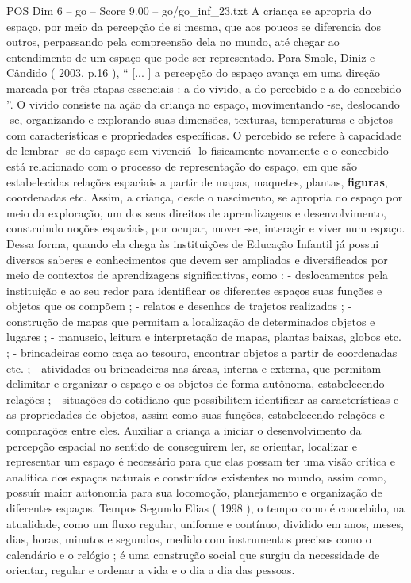 \begin{textsample}{POS Dim 6 – go – Score 9.00 – go/go\_inf\_23.txt}
A criança se apropria do espaço, por meio da percepção de si mesma, que aos poucos se diferencia dos outros, perpassando pela compreensão dela no mundo, até chegar ao entendimento de um espaço que pode ser representado.
Para Smole, Diniz e Cândido ( 2003, p.16 ), “ [... ] a percepção do espaço avança em uma direção marcada por três etapas essenciais : a do vivido, a do percebido e a do concebido ”.
O vivido consiste na ação da criança no espaço, movimentando -se, deslocando -se, organizando e explorando suas dimensões, texturas, temperaturas e objetos com características e propriedades específicas.
O percebido se refere à capacidade de lembrar -se do espaço sem vivenciá -lo fisicamente novamente e o concebido está relacionado com o processo de representação do espaço, em que são estabelecidas relações espaciais a partir de mapas, maquetes, plantas, \textbf{figuras}, coordenadas etc.
Assim, a criança, desde o nascimento, se apropria do espaço por meio da exploração, um dos seus direitos de aprendizagens e desenvolvimento, construindo noções espaciais, por ocupar, mover -se, interagir e viver num espaço.
Dessa forma, quando ela chega às instituições de Educação Infantil já possui diversos saberes e conhecimentos que devem ser ampliados e diversificados por meio de contextos de aprendizagens significativas, como : - deslocamentos pela instituição e ao seu redor para identificar os diferentes espaços suas funções e objetos que os compõem ; - relatos e desenhos de trajetos realizados ; - construção de mapas que permitam a localização de determinados objetos e lugares ; - manuseio, leitura e interpretação de mapas, plantas baixas, globos etc. ; - brincadeiras como caça ao tesouro, encontrar objetos a partir de coordenadas etc. ; - atividades ou brincadeiras nas áreas, interna e externa, que permitam delimitar e organizar o espaço e os objetos de forma autônoma, estabelecendo relações ; - situações do cotidiano que possibilitem identificar as características e as propriedades de objetos, assim como suas funções, estabelecendo relações e comparações entre eles.
Auxiliar a criança a iniciar o desenvolvimento da percepção espacial no sentido de conseguirem ler, se orientar, localizar e representar um espaço é necessário para que elas possam ter uma visão crítica e analítica dos espaços naturais e construídos existentes no mundo, assim como, possuír maior autonomia para sua locomoção, planejamento e organização de diferentes espaços.
Tempos Segundo Elias ( 1998 ), o tempo como é concebido, na atualidade, como um fluxo regular, uniforme e contínuo, dividido em anos, meses, dias, horas, minutos e segundos, medido com instrumentos precisos como o calendário e o relógio ; é uma construção social que surgiu da necessidade de orientar, regular e ordenar a vida e o dia a dia das pessoas.

\end{textsample}
